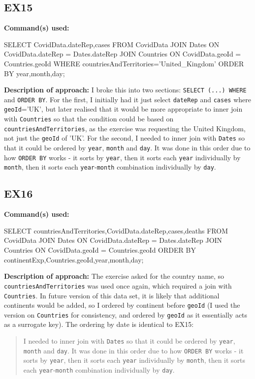 \documentclass{article}
\begin{document}
\subsection{EX15}

\textbf{Command(s) used:}
\begin{spverbatim}
SELECT CovidData.dateRep,cases
FROM CovidData
    JOIN Dates
        ON CovidData.dateRep = Dates.dateRep
    JOIN Countries
        ON CovidData.geoId = Countries.geoId
WHERE countriesAndTerritories='United_Kingdom'
ORDER BY year,month,day;
\end{spverbatim}

\textbf{Description of approach:}
I broke this into two sections: \verb|SELECT (...) WHERE| and \verb|ORDER BY|. For the first, I initially had it just select \verb|dateRep| and \verb|cases| where \verb|geoId|='UK', but later realised that it would be more appropriate to inner join with \verb|Countries| so that the condition could be based on \verb|countriesAndTerritories|, as the exercise was requesting the United Kingdom, not just the \verb|geoId| of 'UK'. For the second, I needed to inner join with \verb|Dates| so that it could be ordered by \verb|year|, \verb|month| and \verb|day|. It was done in this order due to how \verb|ORDER BY| works - it sorts by \verb|year|, then it sorts each \verb|year| individually by \verb|month|, then it sorts each \verb|year|-\verb|month| combination individually by \verb|day|.

\subsection{EX16}

\textbf{Command(s) used:}
\begin{spverbatim}
SELECT countriesAndTerritories,CovidData.dateRep,cases,deaths
FROM CovidData
    JOIN Dates
        ON CovidData.dateRep = Dates.dateRep
    JOIN Countries
        ON CovidData.geoId = Countries.geoId
ORDER BY continentExp,Countries.geoId,year,month,day;
\end{spverbatim}

\textbf{Description of approach:}
The exercise asked for the country name, so \verb|countriesAndTerritories| was used once again, which required a join with \verb|Countries|. In future version of this data set, it is likely that additional continents would be added, so I ordered by continent before \verb|geoId| (I used the version on \verb|Countries| for consistency, and ordered by \verb|geoId| as it essentially acts as a surrogate key). The ordering by date is identical to EX15:
\begin{quote}
I needed to inner join with \verb|Dates| so that it could be ordered by \verb|year|, \verb|month| and \verb|day|. It was done in this order due to how \verb|ORDER BY| works - it sorts by \verb|year|, then it sorts each \verb|year| individually by \verb|month|, then it sorts each \verb|year|-\verb|month| combination individually by \verb|day|.
\end{quote}
\end{document}
